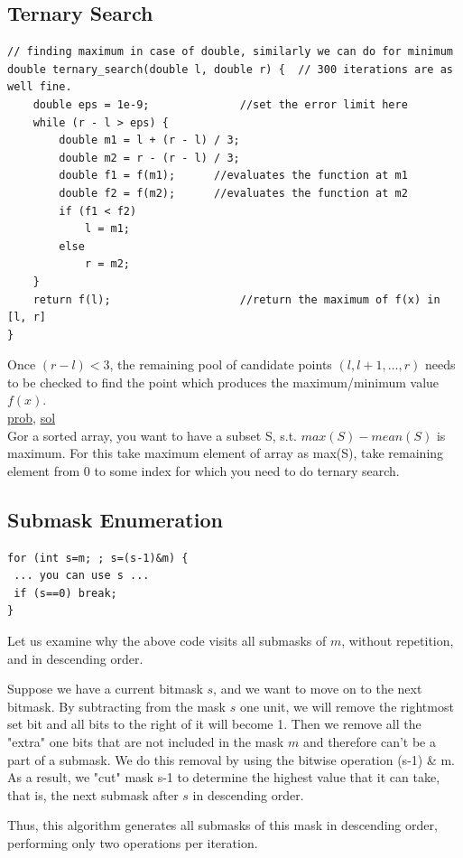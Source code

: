 \documentclass[8pt, a4paper, oneside, twocolumn]{extarticle}
\begin{document}
\subsection{Ternary Search}
\begin{verbatim}
// finding maximum in case of double, similarly we can do for minimum
double ternary_search(double l, double r) {  // 300 iterations are as well fine.
    double eps = 1e-9;              //set the error limit here
    while (r - l > eps) {
        double m1 = l + (r - l) / 3;
        double m2 = r - (r - l) / 3;
        double f1 = f(m1);      //evaluates the function at m1
        double f2 = f(m2);      //evaluates the function at m2
        if (f1 < f2)
            l = m1;
        else
            r = m2;
    }
    return f(l);                    //return the maximum of f(x) in [l, r]
}
\end{verbatim}
Once $(r - l) < 3$, the remaining pool of candidate points $(l, l + 1, \ldots, r)$ needs to be checked to find the point which produces the maximum/minimum value $f(x)$.
\\\href{https://codeforces.com/contest/185/problem/B}{prob}, \href{https://codeforces.com/contest/185/submission/1654904}{sol}
\\Gor a sorted array, you want to have a subset S, s.t. $max(S) - mean(S)$ is maximum. For this take maximum element of array as max(S), take remaining element from 0 to some index for which you need to do ternary search.
\subsection{Submask Enumeration}
\begin{verbatim}
for (int s=m; ; s=(s-1)&m) {
 ... you can use s ...
 if (s==0) break;
}
\end{verbatim}
Let us examine why the above code visits all submasks of $m$, without repetition, and in descending order.

Suppose we have a current bitmask $s$, and we want to move on to the next bitmask. By subtracting from the mask $s$ one unit, we will remove the rightmost set bit and all bits to the right of it will become 1. Then we remove all the "extra" one bits that are not included in the mask $m$ and therefore can't be a part of a submask. We do this removal by using the bitwise operation (s-1) \& m. As a result, we "cut" mask s-1 to determine the highest value that it can take, that is, the next submask after $s$ in descending order.

Thus, this algorithm generates all submasks of this mask in descending order, performing only two operations per iteration.
\end{document}
